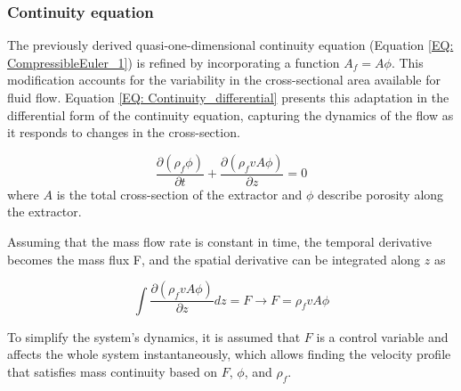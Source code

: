 \documentclass[../Article_Model_Parameters.tex]{subfiles}
\begin{document}
		
	\subsubsection{Continuity equation} \label{CH: Continuity}
	 
	
	The previously derived quasi-one-dimensional continuity equation (Equation \ref{EQ: CompressibleEuler_1}) is refined by incorporating a function $A_f = A\phi$. This modification accounts for the variability in the cross-sectional area available for fluid flow. Equation \ref{EQ: Continuity_differential} presents this adaptation in the differential form of the continuity equation, capturing the dynamics of the flow as it responds to changes in the cross-section.
	
	{\footnotesize
		\begin{equation} \label{EQ: Continuity_differential}
			\frac{\partial (\rho_f \phi)}{\partial t} + \frac{\partial (\rho_f v A\phi)}{\partial z} = 0
		\end{equation}
	}
	where $A$ is the total cross-section of the extractor and $\phi$ describe porosity along the extractor.
	
	
	Assuming that the mass flow rate is constant in time, the temporal derivative becomes the mass flux F, and the spatial derivative can be integrated along $z$ as
	
	{\footnotesize
		\begin{equation}
			\int \frac{\partial (\rho_f v A \phi )}{\partial z} dz = F \rightarrow F=\rho_f v A\phi
		\end{equation}
	}
	
	To simplify the system's dynamics, it is assumed that $F$ is a control variable and affects the whole system instantaneously, which allows finding the velocity profile that satisfies mass continuity based on $F$, $\phi$, and $\rho_f$.
	
\end{document}
